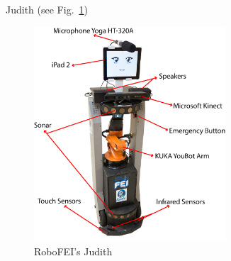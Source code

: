 Judith (see Fig.~\ref{fig:judith})

\begin{figure}[ht]
    \centering
    \includegraphics[height = 8.0cm]{figures/judith_info.png}
    \caption{RoboFEI's Judith}
    \label{fig:judith}
\end{figure}
